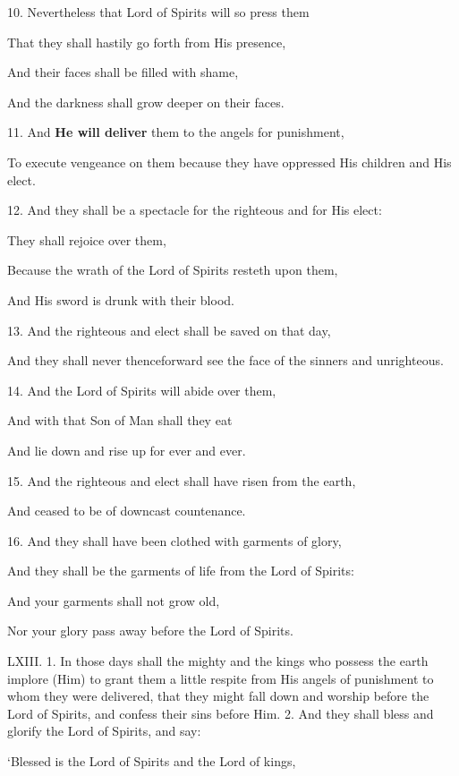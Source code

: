10. Nevertheless that Lord of Spirits will so press them

That they shall hastily go forth from His presence,

And their faces shall be filled with shame,

And the darkness shall grow deeper on their faces.

11. And \textbf{He will deliver} them to the angels for punishment,

To execute vengeance on them because they have oppressed His children and His elect.

12. And they shall be a spectacle for the righteous and for His elect:

They shall rejoice over them,

Because the wrath of the Lord of Spirits resteth upon them,

And His sword is drunk with their blood.

13. And the righteous and elect shall be saved on that day,

And they shall never thenceforward see the face of the sinners and unrighteous.

14. And the Lord of Spirits will abide over them,

And with that Son of Man shall they eat

And lie down and rise up for ever and ever.

15. And the righteous and elect shall have risen from the earth,

And ceased to be of downcast countenance.

16. And they shall have been clothed with garments of glory,

And they shall be the garments of life from the Lord of Spirits:

And your garments shall not grow old,

Nor your glory pass away before the Lord of Spirits.


LXIII. 1. In those days shall the mighty and the
kings who possess the earth implore (Him) to grant
them a little respite from His angels of punishment
to whom they were delivered, that they might fall
down and worship before the Lord of Spirits, and
confess their sins before Him. 2. And they shall
bless and glorify the Lord of Spirits, and say:

‘Blessed is the Lord of Spirits and the Lord of kings,

